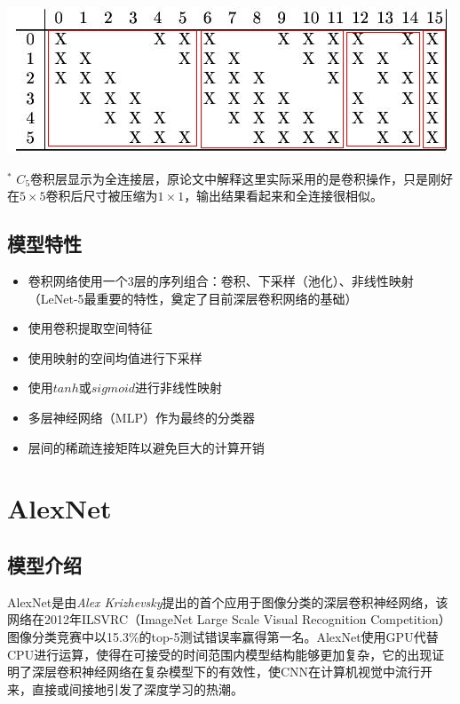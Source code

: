\documentclass[12pt,a4paper,UTF8,twoside]{book}
\providecommand{\tightlist}{%
  \setlength{\itemsep}{0pt}\setlength{\parskip}{0pt}}
\begin{document}
\begin{center}\includegraphics[width=0.7\linewidth]{img/02-02} \end{center}

\(^*\) \(C_5\)卷积层显示为全连接层，原论文中解释这里实际采用的是卷积操作，只是刚好在\(5\times5\)卷积后尺寸被压缩为\(1\times1\)，输出结果看起来和全连接很相似。

\hypertarget{ux6a21ux578bux7279ux6027}{%
\subsection{模型特性}\label{ux6a21ux578bux7279ux6027}}

\begin{itemize}
\tightlist
\item
  卷积网络使用一个3层的序列组合：卷积、下采样（池化）、非线性映射（LeNet-5最重要的特性，奠定了目前深层卷积网络的基础）
\item
  使用卷积提取空间特征
\item
  使用映射的空间均值进行下采样
\item
  使用\(tanh\)或\(sigmoid\)进行非线性映射
\item
  多层神经网络（MLP）作为最终的分类器
\item
  层间的稀疏连接矩阵以避免巨大的计算开销
\end{itemize}

\hypertarget{alexnet}{%
\section{AlexNet}\label{alexnet}}

\hypertarget{ux6a21ux578bux4ecbux7ecd-1}{%
\subsection{模型介绍}\label{ux6a21ux578bux4ecbux7ecd-1}}

AlexNet是由\emph{Alex Krizhevsky}提出的首个应用于图像分类的深层卷积神经网络，该网络在2012年ILSVRC（ImageNet Large Scale Visual Recognition Competition）图像分类竞赛中以15.3\%的top-5测试错误率赢得第一名。AlexNet使用GPU代替CPU进行运算，使得在可接受的时间范围内模型结构能够更加复杂，它的出现证明了深层卷积神经网络在复杂模型下的有效性，使CNN在计算机视觉中流行开来，直接或间接地引发了深度学习的热潮。
\end{document}
